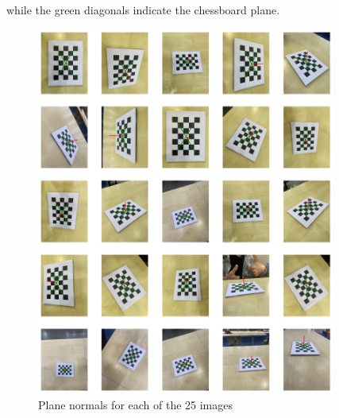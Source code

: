 \documentclass[10pt]{article}
\begin{document}
\begin{enumerate}
        while the green diagonals indicate the chessboard plane.
        \begin{figure}[htbp]
            \begin{center}
                \includegraphics[width=0.875\textwidth]{Assets/Question-4/normals.png}
                \caption{Plane normals for each of the 25 images}
                \label{fig:normals}
            \end{center}
        \end{figure}
    \end{enumerate}
    \pagebreak
\end{document}
